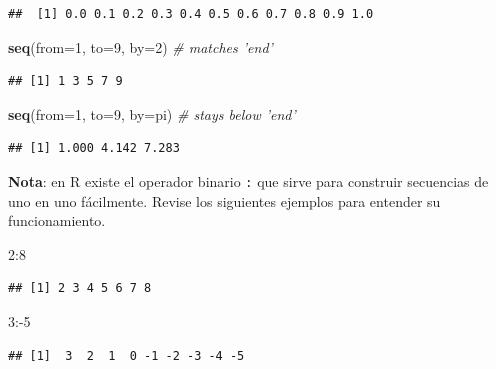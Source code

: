 \documentclass[10pt,]{krantz}
\makeatletter
\newenvironment{Shaded}{\begin{snugshade}}{\end{snugshade}}
\newcommand{\KeywordTok}[1]{\textcolor[rgb]{0.13,0.29,0.53}{\textbf{{#1}}}}
\newcommand{\DataTypeTok}[1]{\textcolor[rgb]{0.13,0.29,0.53}{{#1}}}
\newcommand{\DecValTok}[1]{\textcolor[rgb]{0.00,0.00,0.81}{{#1}}}
\newcommand{\CommentTok}[1]{\textcolor[rgb]{0.56,0.35,0.01}{\textit{{#1}}}}
\newcommand{\NormalTok}[1]{{#1}}
\let\proglang=\textsf
\newenvironment{kframe}{%
\medskip{}
\setlength{\fboxsep}{.8em}
 \def\at@end@of@kframe{}%
 \ifinner\ifhmode%
  \def\at@end@of@kframe{\end{minipage}}%
  \begin{minipage}{\columnwidth}%
 \fi\fi%
 \def\FrameCommand##1{\hskip\@totalleftmargin \hskip-\fboxsep
 \colorbox{shadecolor}{##1}\hskip-\fboxsep
     \hskip-\linewidth \hskip-\@totalleftmargin \hskip\columnwidth}%
 \MakeFramed {\advance\hsize-\width
   \@totalleftmargin\z@ \linewidth\hsize
   \@setminipage}}%
 {\par\unskip\endMakeFramed%
 \at@end@of@kframe}
\renewenvironment{Shaded}{\begin{kframe}}{\end{kframe}}
\makeatother
\begin{document}
\begin{verbatim}
##  [1] 0.0 0.1 0.2 0.3 0.4 0.5 0.6 0.7 0.8 0.9 1.0
\end{verbatim}

\begin{Shaded}
\begin{Highlighting}[]
\KeywordTok{seq}\NormalTok{(}\DataTypeTok{from=}\DecValTok{1}\NormalTok{, }\DataTypeTok{to=}\DecValTok{9}\NormalTok{, }\DataTypeTok{by=}\DecValTok{2}\NormalTok{)  }\CommentTok{# matches 'end'}
\end{Highlighting}
\end{Shaded}

\begin{verbatim}
## [1] 1 3 5 7 9
\end{verbatim}

\begin{Shaded}
\begin{Highlighting}[]
\KeywordTok{seq}\NormalTok{(}\DataTypeTok{from=}\DecValTok{1}\NormalTok{, }\DataTypeTok{to=}\DecValTok{9}\NormalTok{, }\DataTypeTok{by=}\NormalTok{pi) }\CommentTok{# stays below 'end'}
\end{Highlighting}
\end{Shaded}

\begin{verbatim}
## [1] 1.000 4.142 7.283
\end{verbatim}

\textbf{Nota}: en \proglang{R} existe el operador binario \texttt{:} que
sirve para construir secuencias de uno en uno fácilmente. Revise los
siguientes ejemplos para entender su funcionamiento.

\begin{Shaded}
\begin{Highlighting}[]
\DecValTok{2}\NormalTok{:}\DecValTok{8}
\end{Highlighting}
\end{Shaded}

\begin{verbatim}
## [1] 2 3 4 5 6 7 8
\end{verbatim}

\begin{Shaded}
\begin{Highlighting}[]
\DecValTok{3}\NormalTok{:-}\DecValTok{5}
\end{Highlighting}
\end{Shaded}

\begin{verbatim}
## [1]  3  2  1  0 -1 -2 -3 -4 -5
\end{verbatim}
\end{document}
